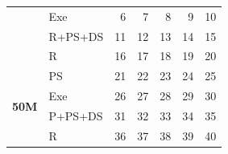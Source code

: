 \begin{figure}[t]
\begin{minipage}[b]{0.34\linewidth}
{\begin{tabular}{|ll|rrrrr|}
               & Exe                                                  & {{6}}                                  & {{7}}                         & {{8}}                                   & {{9}}                      & {{10}}                       \\
               & R+PS+DS                                              & {{11}}                                  & {{12}}                         & {{13}}                                  & {{14}}                      & {{15}}                       \\
               & R                                                    & {{16}}                                 & {{17}}                        & {{18}}                                 & {{19}}                     & {{20}}                      \\                             \hline
               \multirow{4}{*}{\textbf{50M}}                          & PS                                    & {{21}}                         & {{22}}                                  & {{23}}                       & {{24}}                        & {{25}}                        \\
               & Exe                                                  & {{26}}                                 & {{27}}                        & {{28}}                                  & {{29}}                     & {{30}}                      \\
               & P+PS+DS                                              & {{31}}                                 & {{32}}                        & {{33}}                                  & {{34}}                     & {{35}}                      \\
               & R                                                    & {{36}}                                & {{37}}                       & {{38}}                                & {{39}}                    & {{40}}                     \\
               \hline
               \end{tabular}
               }                                                                                                                                                                                                                                                                                                               \\[-4mm]

\end{minipage}
\end{figure}
